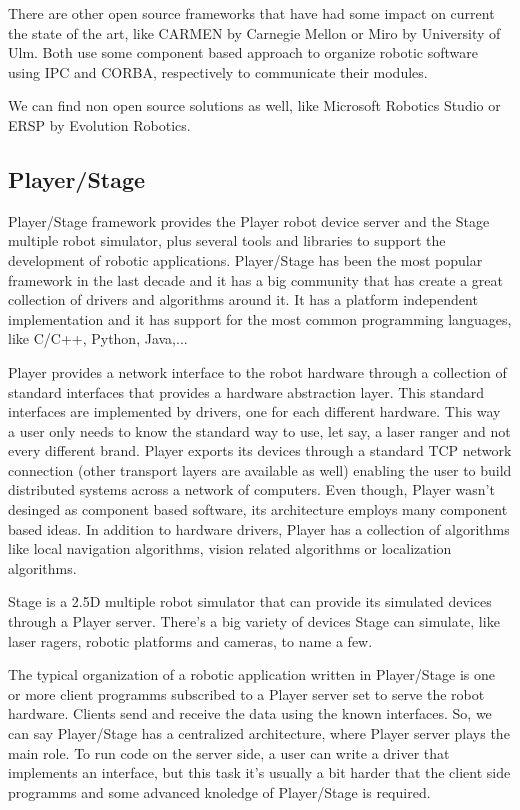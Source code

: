 \documentclass[twocolumn]{svjour3}          %
\begin{document}
There are other open source frameworks that have had some impact on current the state of the art, like CARMEN \cite{montemerlo03} by Carnegie Mellon or Miro \cite{Kraetzschmar02} by University of Ulm. Both use some component based approach to organize robotic software using IPC and CORBA, respectively to communicate their modules.

We can find non open source solutions as well, like Microsoft Robotics Studio or ERSP by Evolution Robotics. 

\subsection{Player/Stage}
Player/Stage framework provides the Player robot device server and the
Stage multiple robot simulator, plus several tools and libraries to support the
development of robotic applications. Player/Stage has been the most
popular framework in the last decade and it has a big community that
has create a great collection of drivers and algorithms around it. It has a platform independent implementation and it has support for the most common programming languages, like C/C++, Python, Java,...

Player provides a network interface to the robot hardware through a collection of standard
interfaces that provides a hardware abstraction layer. This standard interfaces are implemented by drivers, one
for each different hardware. This way a user only needs to know the
standard way to use, let say, a laser ranger and not every different
brand. Player exports its devices through a standard TCP network
connection  (other transport layers are available as well)
enabling the user to build distributed systems across a network of
computers. Even though, Player wasn't desinged as component based software, its architecture employs many component based
ideas. In addition to hardware drivers, Player has a collection of algorithms
like local navigation algorithms, vision related algorithms or
localization algorithms. 

Stage is a 2.5D multiple robot simulator that can provide its
simulated devices through a Player server. There's a big variety of
devices Stage can simulate, like laser ragers, robotic platforms and
cameras, to name a few.

The typical organization of a robotic application written in Player/Stage is one or more client programms subscribed to a Player server set to serve the robot hardware. Clients send and receive the data using the known interfaces. So, we can say Player/Stage has a centralized architecture, where Player server plays the main role. To run code on the server side, a user can write a driver that implements an interface, but this task it's usually a bit harder that the client side programms and some advanced knoledge of Player/Stage is required.
\end{document}
